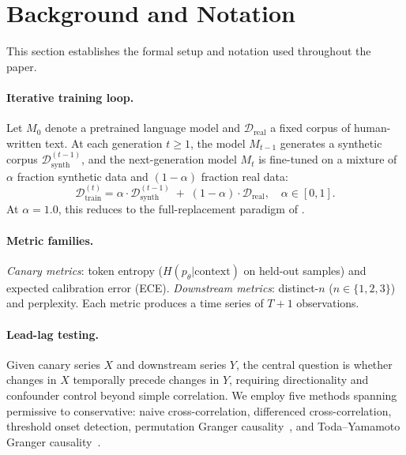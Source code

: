 \section{Background and Notation}
\label{app:background}
\label{sec:background}

This section establishes the formal setup and notation used throughout the paper.

\paragraph{Iterative training loop.}
Let $M_0$ denote a pretrained language model and $\mathcal{D}_\text{real}$ a fixed corpus of human-written text.
At each generation $t \geq 1$, the model $M_{t-1}$ generates a synthetic corpus $\mathcal{D}_\text{synth}^{(t-1)}$, and the next-generation model $M_t$ is fine-tuned on a mixture of $\alpha$ fraction synthetic data and $(1{-}\alpha)$ fraction real data:
\begin{equation}
    \mathcal{D}_\text{train}^{(t)} = \alpha \cdot \mathcal{D}_\text{synth}^{(t-1)} \;+\; (1{-}\alpha) \cdot \mathcal{D}_\text{real}, \quad \alpha \in [0, 1].
    \label{eq:mixing}
\end{equation}
At $\alpha{=}1.0$, this reduces to the full-replacement paradigm of \citet{shumailov2024curse}.

\paragraph{Metric families.}
\emph{Canary metrics}: token entropy ($H(p_\theta | \text{context})$ on held-out samples) and expected calibration error (ECE).
\emph{Downstream metrics}: distinct-$n$ ($n \in \{1, 2, 3\}$)~\citep{li2016diversity} and perplexity.
Each metric produces a time series of $T{+}1$ observations.

\paragraph{Lead-lag testing.}
Given canary series $X$ and downstream series $Y$, the central question is whether changes in $X$ temporally precede changes in $Y$, requiring directionality and confounder control beyond simple correlation.
We employ five methods spanning permissive to conservative: naive cross-correlation, differenced cross-correlation, threshold onset detection, permutation Granger causality~\citep{shojaie2022granger}, and Toda--Yamamoto Granger causality~\citep{toda1995statistical}.

